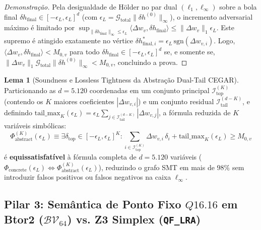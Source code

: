 \documentclass[11pt,a4paper]{article}
\theoremstyle{definition}
\newtheorem{lemma}{Lema}
\begin{document}
\begin{proof}[Demonstração]
Pela desigualdade de Hölder no par dual $(\ell_1, \ell_\infty)$ sobre a bola final $\delta h_{\text{final}} \in [-\epsilon_L, \epsilon_L]^d$ (com $\epsilon_L = \mathcal{G}_{\text{total}}\|\delta h^{(0)}\|_\infty$), o incremento adversarial máximo é limitado por $\sup_{\|\delta h_{\text{final}}\|_\infty \le \epsilon_L} \langle \Delta w_v, \delta h_{\text{final}} \rangle \le \|\Delta w_v\|_1 \epsilon_L$. Este supremo é atingido exatamente no vértice $\delta h_{\text{final},i}^* = \epsilon_L\,\text{sgn}(\Delta w_{v,i})$. Logo, $\langle \Delta w_v, \delta h_{\text{final}} \rangle < M_{0,v}$ para todo $\delta h_{\text{final}} \in [-\epsilon_L, \epsilon_L]^d$ se, e somente se, $\|\Delta w_v\|_1 \mathcal{G}_{\text{total}} \|\delta h^{(0)}\|_\infty < M_{0,v}$, concluindo a prova.
\end{proof}

\begin{lemma}[Soundness e Lossless Tightness da Abstração Dual-Tail CEGAR]
\label{lem:qwen_cegar}
Particionando as $d = 5.120$ coordenadas em um conjunto principal $\mathcal{I}_{\text{top}}^{(K)}$ (contendo os $K$ maiores coeficientes $|\Delta w_{v,i}|$) e um conjunto residual $\mathcal{I}_{\text{tail}}^{(d-K)}$, e definindo $\mathrm{tail\_max}_K(\epsilon_L) = \epsilon_L \sum_{j \in \mathcal{I}_{\text{tail}}^{(d-K)}} |\Delta w_{v,j}|$, a fórmula reduzida de $K$ variáveis simbólicas:
\begin{equation}
    \Phi_{\text{abstract}}^{(K)}(\epsilon_L) \equiv \exists \delta_{\text{top}} \in [-\epsilon_L, \epsilon_L]^K : \sum_{i \in \mathcal{I}_{\text{top}}^{(K)}} \Delta w_{v,i}\,\delta_i + \mathrm{tail\_max}_K(\epsilon_L) \ge M_{0,v}
\end{equation}
é \textbf{equissatisfatível} à fórmula completa de $d=5.120$ variáveis ($\Phi_{\text{concrete}}(\epsilon_L) \iff \Phi_{\text{abstract}}^{(K)}(\epsilon_L)$), reduzindo o grafo SMT em mais de $98\%$ sem introduzir falsos positivos ou falsos negativos na caixa $\ell_\infty$.
\end{lemma}

\subsection{Pilar 3: Semântica de Ponto Fixo \texorpdfstring{$Q16.16$}{Q16.16} em Btor2 (\texorpdfstring{$\mathcal{BV}_{64}$}{BV64}) vs. Z3 Simplex (\texttt{QF\_LRA})}
\end{document}
